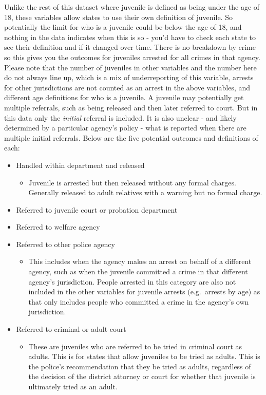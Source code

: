 \documentclass[
]{krantz}
\providecommand{\tightlist}{%
  \setlength{\itemsep}{0pt}\setlength{\parskip}{0pt}}
\begin{document}
Unlike the rest of this dataset where juvenile is defined as
being under the age of 18, these variables allow states to
use their own definition of juvenile. So potentially the
limit for who is a juvenile could be below the age of 18,
and nothing in the data indicates when this is so - you'd
have to check each state to see their definition and if it
changed over time. There is no breakdown by crime so this
gives you the outcomes for juveniles arrested for all crimes
in that agency. Please note that the number of juveniles in
other variables and the number here do not always line up,
which is a mix of underreporting of this variable, arrests
for other jurisdictions are not counted as an arrest in the
above variables, and different age definitions for who is a
juvenile. A juvenile may potentially get multiple referrals,
such as being released and then later referred to court. But
in this data only the \emph{initial} referral is included.
It is also unclear - and likely determined by a particular
agency's policy - what is reported when there are multiple
initial referrals. Below are the five potential outcomes and
definitions of each:

\begin{itemize}
\tightlist
\item
  Handled within department and released

  \begin{itemize}
  \tightlist
  \item
    Juvenile is arrested but then released without any
    formal charges. Generally released to adult relatives
    with a warning but no formal charge.
  \end{itemize}
\item
  Referred to juvenile court or probation department
\item
  Referred to welfare agency
\item
  Referred to other police agency

  \begin{itemize}
  \tightlist
  \item
    This includes when the agency makes an arrest on behalf
    of a different agency, such as when the juvenile
    committed a crime in that different agency's
    jurisdiction. People arrested in this category are also
    not included in the other variables for juvenile arrests
    (e.g.~arrests by age) as that only includes people who
    committed a crime in the agency's own jurisdiction.
  \end{itemize}
\item
  Referred to criminal or adult court

  \begin{itemize}
  \tightlist
  \item
    These are juveniles who are referred to be tried in
    criminal court as adults. This is for states that allow
    juveniles to be tried as adults. This is the police's
    recommendation that they be tried as adults, regardless
    of the decision of the district attorney or court for
    whether that juvenile is ultimately tried as an adult.
  \end{itemize}
\end{itemize}
\end{document}
